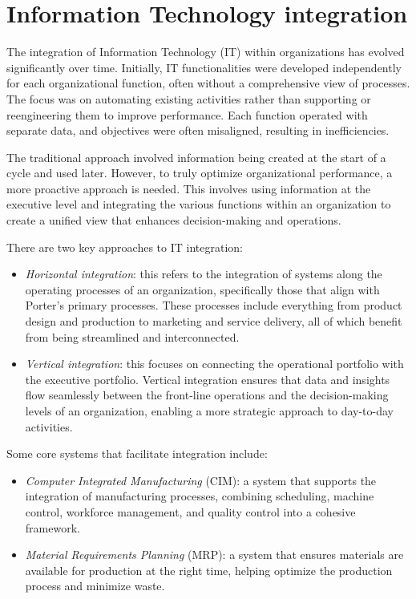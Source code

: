 \section{Information Technology integration}

The integration of Information Technology (IT) within organizations has evolved significantly over time. 
Initially, IT functionalities were developed independently for each organizational function, often without a comprehensive view of processes. 
The focus was on automating existing activities rather than supporting or reengineering them to improve performance. 
Each function operated with separate data, and objectives were often misaligned, resulting in inefficiencies.

The traditional approach involved information being created at the start of a cycle and used later. 
However, to truly optimize organizational performance, a more proactive approach is needed. 
This involves using information at the executive level and integrating the various functions within an organization to create a unified view that enhances decision-making and operations.

There are two key approaches to IT integration:
\begin{itemize}
    \item \textit{Horizontal integration}: this refers to the integration of systems along the operating processes of an organization, specifically those that align with Porter's primary processes.
        These processes include everything from product design and production to marketing and service delivery, all of which benefit from being streamlined and interconnected.
    \item \textit{Vertical integration}: this focuses on connecting the operational portfolio with the executive portfolio. 
        Vertical integration ensures that data and insights flow seamlessly between the front-line operations and the decision-making levels of an organization, enabling a more strategic approach to day-to-day activities.
\end{itemize}
\noindent Some core systems that facilitate integration include:
\begin{itemize}
    \item \textit{Computer Integrated Manufacturing} (CIM): a system that supports the integration of manufacturing processes, combining scheduling, machine control, workforce management, and quality control into a cohesive framework.
    \item \textit{Material Requirements Planning} (MRP): a system that ensures materials are available for production at the right time, helping optimize the production process and minimize waste.
\end{itemize}

